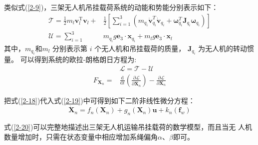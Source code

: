 \documentclass[lang=chs, degree=master, blindreview=false, winfonts=true]{yanputhesis}
\begin{document}
类似式(\ref{2-9})，三架无人机吊挂载荷系统的动能和势能分别表示如下：
\begin{equation}
	\begin{aligned}
	\mathcal{T}=\frac{1}{2}m_{l}{\boldsymbol{v}}_{l}^\mathrm{T}{\boldsymbol{v}}_{l}+&\frac{1}{2}\left[\sum_{i=1}^{3}\left(m_{q_{i}}\dot{\boldsymbol{v}}_{q_{i}}^{T}\dot{\boldsymbol{v}}_{q_{i}}+\boldsymbol{\omega}_{q_{i}}^{T}\boldsymbol{J}_{q_{i}}\boldsymbol{\omega}_{q_{i}}\right)\right] \\
	\mathcal{U}=\sum_{i=1}^{3}&m_{q_{i}}g\boldsymbol{e}_3\cdot\boldsymbol{x}_{q_{i}}+m_{l}g\boldsymbol{e}_3\cdot\boldsymbol{x}_{l}
\end{aligned}
\label{2-18}
\end{equation}
其中，$m_{q_{i}}$和$m_l$ 分别表示第 $i$ 个无人机和吊挂载荷的质量，
$\boldsymbol{J}_{q_{i}}$ 为无人机的转动惯量。
可以得到系统的欧拉-朗格朗日方程为:
\begin{equation}
\begin{aligned}
	&\mathcal{L}=\mathcal{T}-\mathcal{U} \\
	{F}_{\boldsymbol{X}_n}=&\frac{\mathrm{d}}{\mathrm{d}t}\left(\frac{\partial\mathcal{L}}{\partial\dot{\boldsymbol{X}_n}}\right)-\frac{\partial\mathcal{L}}{\partial\boldsymbol{X}_n}
\end{aligned}
\label{2-19}
\end{equation}

把式(\ref{2-18})代入式(\ref{2-19})中可得到如下二阶非线性微分方程：
\begin{equation}	
	\dot{\bm X}_n= f_n(\bm X_n)+ g_n(\bm X_n)\bm u+ k_{n}\left(\bm f_{w}\right)
	\label{2-20}
\end{equation}

式(\ref{2-20})可以完整地描述出三架无人机运输吊挂载荷的数学模型，而且当无
人机数量增加时，只需在状态变量中相应增加系绳偏角$\alpha$、$\beta$即可。
\end{document}
